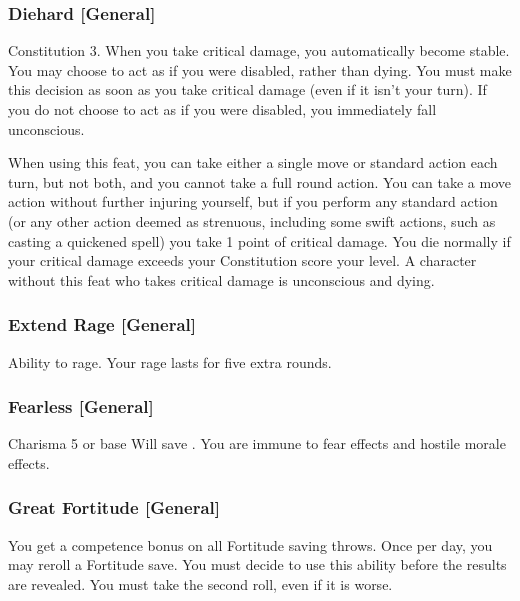 \subsubsection{Diehard [General]}
 Constitution 3.
 When you take critical damage, you automatically become stable. You may choose to act as if you were disabled, rather than dying. You must make this decision as soon as you take critical damage (even if it isn't your turn). If you do not choose to act as if you were disabled, you immediately fall unconscious.
\par When using this feat, you can take either a single move or standard action each turn, but not both, and you cannot take a full round action. You can take a move action without further injuring yourself, but if you perform any standard action (or any other action deemed as strenuous, including some swift actions, such as casting a quickened spell) you take 1 point of critical damage. You die normally if your critical damage exceeds your Constitution score \add your level.
 A character without this feat who takes critical damage is unconscious and dying.

\subsubsection{Extend Rage [General]}
 Ability to rage.
 Your rage lasts for five extra rounds.

\subsubsection{Fearless [General]}
\featpre Charisma 5 or base Will save .
\featben You are immune to fear effects and hostile morale effects.

\subsubsection{Great Fortitude [General]}
 You get a  competence bonus on all Fortitude saving throws. Once per day, you may reroll a Fortitude save. You must decide to use this ability before the results are revealed. You must take the second roll, even if it is worse.


